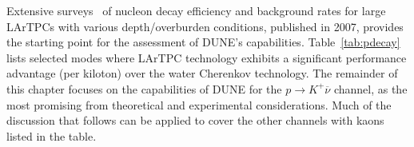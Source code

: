 Extensive surveys~\cite{Bueno:2007um,klinger} of nucleon decay efficiency 
and background rates for large LArTPCs with various depth/overburden 
conditions, published in 2007, provides the starting point for the 
assessment of DUNE's capabilities.  Table~\ref{tab:pdecay} lists selected
modes where LArTPC technology exhibits a significant performance 
advantage (per kiloton) over the water Cherenkov technology.
The remainder of this chapter focuses on the capabilities 
of DUNE for the $p\to K^+\overline{\nu}$ channel, as the most 
promising from theoretical and experimental 
considerations.  Much of the discussion that follows can be 
applied to cover the other channels with kaons listed in 
the table.
%
\begin{table}[!htbp]
\caption[Efficiencies and background rates for nucleon decay modes]
        {Efficiencies and background rates (events per \SI{}{\Mtyr}) for nucleon decay 
         channels of interest for a large underground LArTPC~\cite{Bueno:2007um}, and 
         comparison with water Cherenkov detector capabilities.  
         The entries for the water Cherenkov capabilities are based 
         on experience with the \superk{} detector~\cite{kearns_isoups}.  
        }
\begin{center}
\end{center}
\label{tab:pdecay}
\end{table}
%

